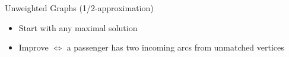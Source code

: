 \begin{frame}{Unweighted Graphs (1/2-approximation)}
\begin{itemize}
  \item Start with any maximal solution
  \item Improve $\iff$ a passenger has two incoming arcs from unmatched vertices
\end{itemize}
\centering

\end{frame}